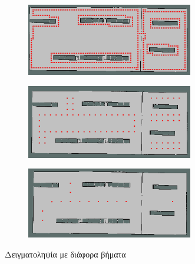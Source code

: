 \begin{figure}
     \centering
     \begin{subfigure}[b]{\textwidth}
         \centering
         \includegraphics[width=0.8\textwidth]{./images/chapter5/warehouse_4_sampling_steps_1.png}
         \label{fig:warehouse_4_sampling_steps_1}
     \end{subfigure}
     \hfill
     \begin{subfigure}[b]{\textwidth}
         \centering
         \includegraphics[width=0.8\textwidth]{./images/chapter5/warehouse_4_sampling_steps_2.png}
         \label{fig:warehouse_4_sampling_steps_2}
     \end{subfigure}
     \hfill
     \begin{subfigure}[b]{\textwidth}
         \centering
         \includegraphics[width=0.8\textwidth]{./images/chapter5/warehouse_4_sampling_steps_3.png}
         \label{fig:warehouse_4_sampling_steps_3}
     \end{subfigure}
    \caption{Δειγματοληψία με διάφορα βήματα}
    \label{fig:sampling_steps_examples}
\end{figure}


